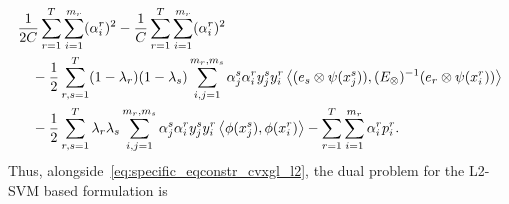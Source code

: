 \begin{equation}
    \nonumber
    \begin{aligned}
         & \frac{1}{2C} \sum_{r=1}^T \sum_{i=1}^{m_r} (\alpha_i^r)^2 - \frac{1}{C} \sum_{r=1}^T \sum_{i=1}^{m_r} (\alpha_i^r)^2                                                                             \\
         & \quad - \frac{1}{2} \sum_{r, s=1}^T (1-\lambda_r)(1-\lambda_s) \sum_{i, j=1}^{m_r, m_s} \alpha_j^s \alpha_i^r y_j^s y_i^r \bm{\left\langle} (e_s \otimes \psi(x_j^s)), (E_\otimes)^{-1} (e_r \otimes \psi(x_i^r)) \bm{\right\rangle}             \\
         & \quad - \frac{1}{2} \sum_{r,s=1}^T \lambda_r \lambda_s \sum_{i, j=1}^{m_r, m_s} \alpha_j^s \alpha_i^r y_j^s y_i^r \bm{\left\langle} \phi(x_j^s), \phi(x_i^r) \bm{\right\rangle} - \sum_{r=1}^T \sum_{i=1}^{m_r} \alpha_i^r p_i^r . \\
    \end{aligned}
\end{equation}
Thus, alongside~\eqref{eq:specific_eqconstr_cvxgl_l2}, the dual problem for the L2-SVM based formulation is
